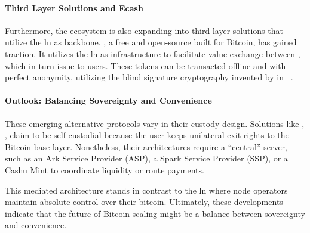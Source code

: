 \paragraph{Third Layer Solutions and Ecash}

Furthermore, the ecosystem is also expanding into third layer solutions that utilize the \gls{ln} as backbone. 
, a free and open-source  built for Bitcoin, has gained traction. 
It utilizes the \gls{ln} as infrastructure to facilitate value exchange between , 
which in turn issue  to users. 
These tokens can be transacted offline and with perfect anonymity, 
utilizing the blind signature cryptography invented by \citeauthor{chaum_blind_1983} in \citeyear{chaum_blind_1983}~\cite{chaum_blind_1983}.


\paragraph{Outlook: Balancing Sovereignty and Convenience}

These emerging alternative protocols vary in their custody design.
Solutions like , ,  claim to be self-custodial
because the user keeps unilateral exit rights to the Bitcoin base layer.
Nonetheless, their architectures require a \enquote{central} server, 
such as an Ark Service Provider (ASP), a Spark Service Provider (SSP), or a Cashu Mint
to coordinate liquidity or route payments. 

This mediated architecture stands in contrast to the \gls{ln} where
node operators maintain absolute control over their bitcoin. 
Ultimately, these developments indicate that the future of Bitcoin scaling 
might be a balance between sovereignty and convenience. 